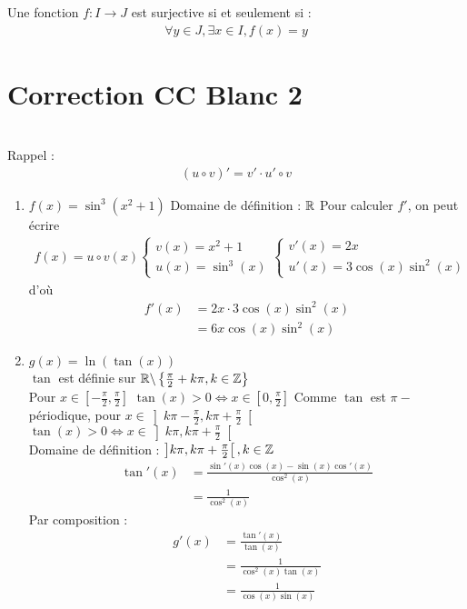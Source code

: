 \begin{exercice}
    \par Une fonction $f:I \to J$ est surjective si et seulement si :
\begin{align*}
    \forall y \in J, \exists x \in I, f(x) = y
\end{align*}
\end{exercice}

\section{Correction CC Blanc 2}
\begin{exercice}~ 
\\
Rappel :
\begin{align*}
(u \circ v)' = v' \cdot u' \circ v 
\end{align*}
\begin{enumerate}
\item
$f(x) = \sin^3(x^2+1)$
Domaine de définition : $\mathbb{R}$
Pour calculer $f'$, on peut écrire 
\begin{align*}
f(x) = u \circ v(x) 
\begin{cases}
v(x) = x^2 +1 \\
u(x) = \sin^3(x)
\end{cases}
\begin{cases}
v'(x) = 2x \\
u'(x) = 3\cos(x)\sin^2(x)
\end{cases}
\end{align*}
d'où 
\begin{align*}
f'(x) &= 2x \cdot 3\cos(x)\sin^2(x) \\
	  &= 6x \cos(x) \sin^2(x)
\end{align*}

\item 
$g(x) = \ln(\tan(x))$
\\
$\tan$ est définie sur $\mathbb{R} \backslash \left\{ \frac{\pi}{2} + k\pi, k \in \mathbb{Z} \right\}$
\\
Pour $x \in \left[ -\frac{\pi}{2}, \frac{\pi}{2} \right]$
$\tan(x) > 0 \iff x \in \left[ 0, \frac{\pi}{2} \right]$
Comme $\tan$ est $\pi-$périodique, pour $x \in \left] k\pi - \frac{\pi}{2}, k \pi + \frac{\pi}{2} \right[ $
\\
$\tan(x) > 0 \iff x \in \left] k\pi, k\pi + \frac{\pi}{2} \right[$
\\
Domaine de définition : $\left] k \pi , k \pi + \frac{\pi}{2} \right[, k \in \mathbb{Z}$ 
\begin{align*}
\tan'(x) &= \frac{\sin'(x) \cos(x) - \sin(x) \cos'(x)}{\cos^2(x)} \\
         &= \frac{1}{\cos^2(x)}
\end{align*}
Par composition :
\begin{align*}
g'(x) &= \frac{\tan'(x)}{\tan(x)} \\
	  &= \frac{1}{\cos^2(x)\tan(x)} \\
	  &= \frac{1}{\cos(x)\sin(x)}
\end{align*}
\end{enumerate}
\end{exercice}

